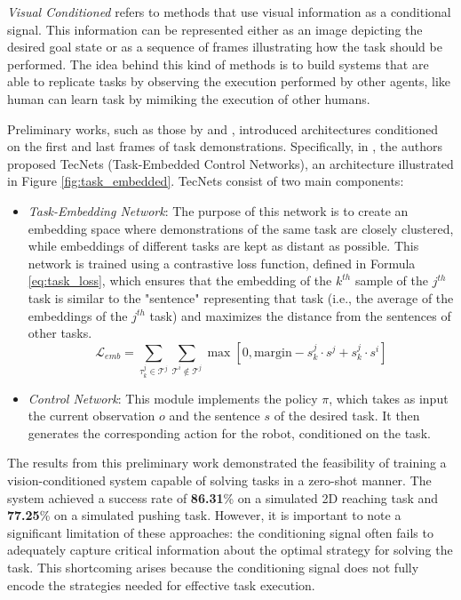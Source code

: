 \textit{Visual Conditioned} refers to methods that use visual information as a conditional signal. This information can be represented either as an image depicting the desired goal state or as a sequence of frames illustrating how the task should be performed. The idea behind this kind of methods is to build systems that are able to replicate tasks by observing the execution performed by other agents, like human can learn task by mimiking the execution of other humans.

Preliminary works, such as those by \cite{james2018task_embedded} and \cite{bhutani2022attentive_one_shot}, introduced architectures conditioned on the first and last frames of task demonstrations. Specifically, in \cite{james2018task_embedded}, the authors proposed TecNets (Task-Embedded Control Networks), an architecture illustrated in Figure \ref{fig:task_embedded}. TecNets consist of two main components:

\begin{itemize}
    \item \textit{Task-Embedding Network}: The purpose of this network is to create an embedding space where demonstrations of the same task are closely clustered, while embeddings of different tasks are kept as distant as possible. This network is trained using a contrastive loss function, defined in Formula \ref{eq:task_loss}, which ensures that the embedding of the $k^{th}$ sample of the $j^{th}$ task is similar to the "sentence" representing that task (i.e., the average of the embeddings of the $j^{th}$ task) and maximizes the distance from the sentences of other tasks.
    \begin{equation}
        \label{eq:task_loss}
        \mathcal{L}_{emb} = \sum_{\tau^{j}_{k} \in \mathcal{T}^{j}}\sum_{ \mathcal{T}^{i} \notin \mathcal{T}^{j}} \max \left[ 0, \text{margin} - s^{j}_{k}\cdot s^j + s^{j}_{k}\cdot s^i \right]
    \end{equation}
    \item \textit{Control Network}: This module implements the policy $\pi$, which takes as input the current observation $o$ and the sentence $s$ of the desired task. It then generates the corresponding action for the robot, conditioned on the task.
\end{itemize}



The results from this preliminary work demonstrated the feasibility of training a vision-conditioned system capable of solving tasks in a zero-shot manner. The system achieved a success rate of \textbf{86.31}\% on a simulated 2D reaching task and \textbf{77.25}\% on a simulated pushing task. However, it is important to note a significant limitation of these approaches: the conditioning signal often fails to adequately capture critical information about the optimal strategy for solving the task. This shortcoming arises because the conditioning signal does not fully encode the strategies needed for effective task execution.



